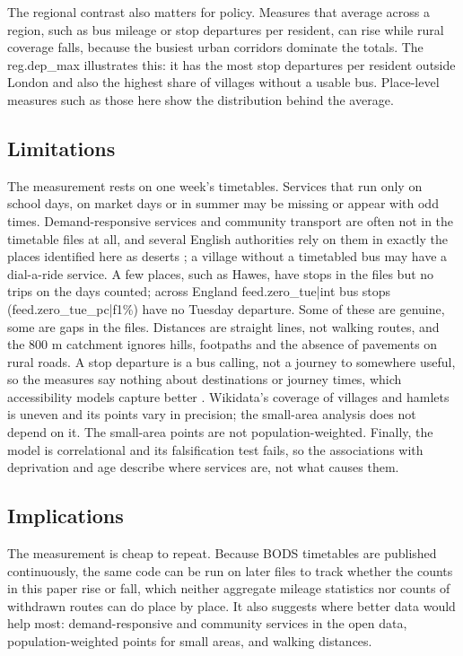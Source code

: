 \documentclass[11pt,a4paper]{article}
\begin{document}
The regional contrast also matters for policy. Measures that average across a region, such as bus mileage or stop departures per resident, can rise while rural coverage falls, because the busiest urban corridors dominate the totals. The {{reg.dep_max}} illustrates this: it has the most stop departures per resident outside London and also the highest share of villages without a usable bus. Place-level measures such as those here show the distribution behind the average.

\subsection{Limitations}
The measurement rests on one week's timetables. Services that run only on school days, on market days or in summer may be missing or appear with odd times. Demand-responsive services and community transport are often not in the timetable files at all, and several English authorities rely on them in exactly the places identified here as deserts \citep{mulley2009,gray2006}; a village without a timetabled bus may have a dial-a-ride service. A few places, such as Hawes, have stops in the files but no trips on the days counted; across England {{feed.zero_tue|int}} bus stops ({{feed.zero_tue_pc|f1}}\%) have no Tuesday departure. Some of these are genuine, some are gaps in the files. Distances are straight lines, not walking routes, and the 800 m catchment ignores hills, footpaths and the absence of pavements on rural roads. A stop departure is a bus calling, not a journey to somewhere useful, so the measures say nothing about destinations or journey times, which accessibility models capture better \citep{geurs2004}. Wikidata's coverage of villages and hamlets is uneven and its points vary in precision; the small-area analysis does not depend on it. The small-area points are not population-weighted. Finally, the model is correlational and its falsification test fails, so the associations with deprivation and age describe where services are, not what causes them.

\subsection{Implications}
The measurement is cheap to repeat. Because BODS timetables are published continuously, the same code can be run on later files to track whether the counts in this paper rise or fall, which neither aggregate mileage statistics nor counts of withdrawn routes can do place by place. It also suggests where better data would help most: demand-responsive and community services in the open data, population-weighted points for small areas, and walking distances.
\end{document}

